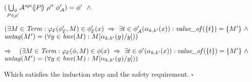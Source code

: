\documentclass[10pt,a4paper,final,oneside,fleqn]{book}
\begin{document}
\noindent
$(\underset{P\in\rho'}{\bigcup_\phi}\mathcal{A}^{spi}(\![P]\!)~\rho''~\phi'_\mathcal{A})=\phi'~~\wedge\vspace{3mm}$

\noindent
$(\exists M\in\mbox{{\itshape Term\/}}:\varphi_\mathcal{E}(\phi'_\mathcal{E},M)\in\phi'_\mathcal{E}(x)~\Rightarrow~\exists t\in\phi'_\mathcal{A}(\alpha_{k,k'}(x)):\mbox{{\itshape value\_of\/}}(\{t\})=\{M'\}~\wedge$\\
$\mbox{{\itshape untag\/}}(M')=(\forall y\in\mbox{{\itshape bnv\/}}(M):M[\alpha_{k,k'}(y)/y]))$\vspace{5mm}

\noindent
$\Rightarrow~~~(\exists M\in\mbox{{\itshape Term\/}}:\varphi_\mathcal{E}(\phi,M)\in\phi(x)~\Rightarrow~\exists t\in\phi'(\alpha_{k,k'}(x)): \mbox{{\itshape value\_of\/}}(\{t\})=\{M'\}~\wedge$\\
$\mbox{{\itshape untag\/}}(M')=(\forall y\in\mbox{{\itshape bnv\/}}(M):M[\alpha_{k,k'}(y)/y]))$\vspace{5mm}

\noindent
Which satisfies the induction step and the safety requirement.\vspace{5mm}
\vfill
\noindent
$\square$
\end{document}

